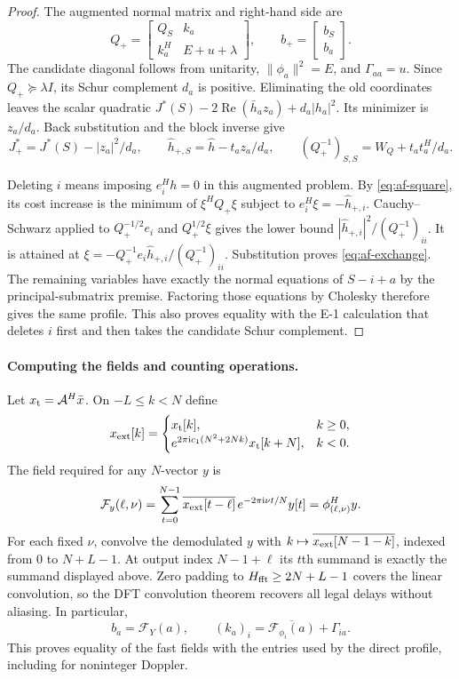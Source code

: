 \begin{proof}
The augmented normal matrix and right-hand side are
\[
 Q_+=\begin{bmatrix}Q_S&k_a\\ k_a^H&E+u+\lambda\end{bmatrix},
 \qquad b_+=\begin{bmatrix}b_S\\ b_a\end{bmatrix}.
\]
The candidate diagonal follows from unitarity, $\|\phi_a\|^2=E$,
and $\Gamma_{aa}=u$. Since $Q_+\succeq\lambda I$, its Schur complement
$d_a$ is positive. Eliminating the old coordinates leaves the scalar
quadratic $J^*(S)-2\operatorname{Re}(\bar h_a z_a)+d_a|h_a|^2$.
Its minimizer is $z_a/d_a$. Back substitution and the block inverse give
\[
 J_+^*=J^*(S)-|z_a|^2/d_a,\qquad
 \hat h_{+,S}=\hat h-t_a z_a/d_a,\qquad
 (Q_+^{-1})_{S,S}=W_Q+t_at_a^H/d_a .
\]

Deleting $i$ means imposing $e_i^Hh=0$ in this augmented problem.
By \eqref{eq:af-square}, its cost increase is the minimum of
$\xi^HQ_+\xi$ subject to $e_i^H\xi=-\hat h_{+,i}$.
Cauchy--Schwarz applied to $Q_+^{-1/2}e_i$ and $Q_+^{1/2}\xi$ gives
the lower bound $|\hat h_{+,i}|^2/(Q_+^{-1})_{ii}$. It is attained at
$\xi=-Q_+^{-1}e_i\hat h_{+,i}/(Q_+^{-1})_{ii}$.
Substitution proves \eqref{eq:af-exchange}. The remaining variables
have exactly the normal equations of $S-i+a$ by the principal-submatrix
premise. Factoring those equations by Cholesky therefore gives the same
profile. This also proves equality with the E-1 calculation that deletes
$i$ first and then takes the candidate Schur complement.
\end{proof}

\paragraph{Computing the fields and counting operations.}
Let $x_{\rm t}=\mathcal A^H\bar x$. On $-L\le k<N$ define
\[
 x_{\rm ext}[k]=
 \begin{cases}
 x_{\rm t}[k],&k\ge0,\\
 e^{2\pi\mathrm{i}c_1(N^2+2Nk)}x_{\rm t}[k+N],&k<0.
 \end{cases}
\]
The field required for any $N$-vector $y$ is
\[
 \mathcal F_y(\ell,\nu)
 =\sum_{t=0}^{N-1}\overline{x_{\rm ext}[t-\ell]}\,
     e^{-2\pi\mathrm{i}\nu t/N}y[t]
 =\phi_{(\ell,\nu)}^Hy .
\]
For each fixed $\nu$, convolve the demodulated $y$ with
$k\mapsto\overline{x_{\rm ext}[N-1-k]}$, indexed from $0$ to $N+L-1$.
At output index $N-1+\ell$ its $t$th summand is exactly the summand
displayed above. Zero padding to $H_{\rm fft}\ge2N+L-1$ covers the
linear convolution, so the DFT convolution theorem recovers all legal
delays without aliasing. In particular,
\[
 b_a=\mathcal F_Y(a),\qquad
 (k_a)_i=\overline{\mathcal F_{\phi_i}(a)}+\Gamma_{ia}.
\]
This proves equality of the fast fields with the entries used by the
direct profile, including for noninteger Doppler.

